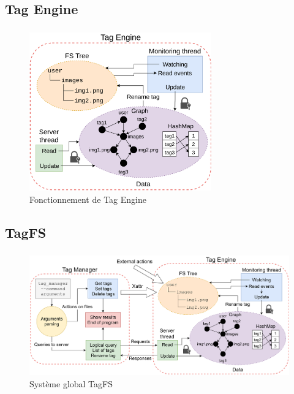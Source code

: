 \documentclass[10pt]{beamer}
\begin{document}
\subsection{Tag Engine}
\begin{frame}
    \frametitle{\subsecname}
    \begin{figure}
        \begin{center}
            \includegraphics[width=0.7\textwidth]{images/tag_engine2.png}
            \caption{Fonctionnement de Tag Engine}
        \end{center}
    \end{figure}
\end{frame}

\subsection{TagFS}
\begin{frame}
    \frametitle{\subsecname}
    \begin{figure}
        \begin{center}
            \includegraphics[width=1\textwidth]{images/tagfs4.png}
            \caption{Système global TagFS}
        \end{center}
    \end{figure}
\end{frame}
\end{document}
